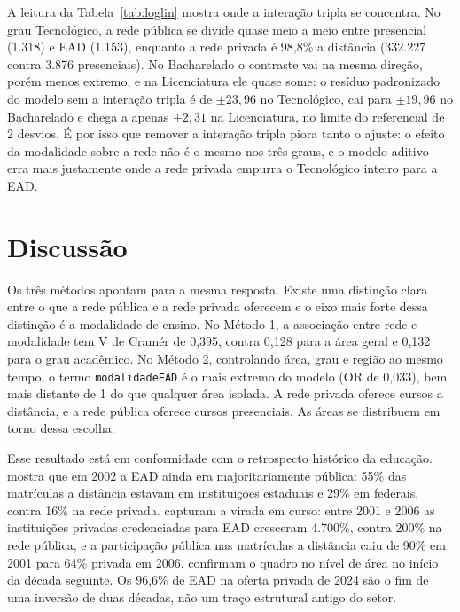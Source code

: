 \documentclass[12pt]{article}
\begin{document}
A leitura da Tabela~\ref{tab:loglin} mostra onde a interação tripla se concentra. No grau Tecnológico, a rede pública se divide quase meio a meio entre presencial (1.318) e EAD (1.153), enquanto a rede privada é 98,8\% a distância (332.227 contra 3.876 presenciais). No Bacharelado o contraste vai na mesma direção, porém menos extremo, e na Licenciatura ele quase some: o resíduo padronizado do modelo sem a interação tripla é de $\pm23{,}96$ no Tecnológico, cai para $\pm19{,}96$ no Bacharelado e chega a apenas $\pm2{,}31$ na Licenciatura, no limite do referencial de 2 desvios. É por isso que remover a interação tripla piora tanto o ajuste: o efeito da modalidade sobre a rede não é o mesmo nos três graus, e o modelo aditivo erra mais justamente onde a rede privada empurra o Tecnológico inteiro para a EAD.

\section{Discussão}
Os três métodos apontam para a mesma resposta. Existe uma distinção clara entre o que a rede pública e a rede privada oferecem e o eixo mais forte dessa distinção é a modalidade de ensino. No Método 1, a associação entre rede e modalidade tem V de Cramér de 0,395, contra 0,128 para a área geral e 0,132 para o grau acadêmico. No Método 2, controlando área, grau e região ao mesmo tempo, o termo \texttt{modalidadeEAD} é o mais extremo do modelo (OR de 0,033), bem mais distante de 1 do que qualquer área isolada. A rede privada oferece cursos a distância, e a rede pública oferece cursos presenciais. As áreas se distribuem em torno dessa escolha.

Esse resultado está em conformidade com o retrospecto histórico da educação. \textcite{pintoAcessoEducacaoSuperior2004} mostra que em 2002 a EAD ainda era majoritariamente pública: 55\% das matrículas a distância estavam em instituições estaduais e 29\% em federais, contra 16\% na rede privada. \textcite{segenreichExpansaoPrivatizacaoDiferenciacao2009} capturam a virada em curso: entre 2001 e 2006 as instituições privadas credenciadas para EAD cresceram 4.700\%, contra 200\% na rede pública, e a participação pública nas matrículas a distância caiu de 90\% em 2001 para 64\% privada em 2006. \textcite{motaEDUCACAOSUPERIOREM2012} confirmam o quadro no nível de área no início da década seguinte. Os 96,6\% de EAD na oferta privada de 2024 são o fim de uma inversão de duas décadas, não um traço estrutural antigo do setor.
\end{document}
